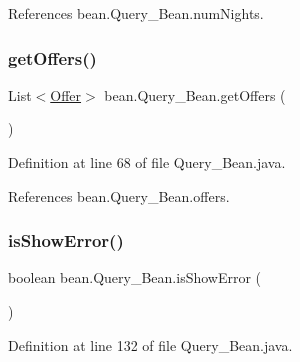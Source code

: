 References bean.\+Query\+\_\+\+Bean.\+num\+Nights.

\mbox{\label{classbean_1_1Query__Bean_a959034af24769ce6348b49a1c0c57d6f}} 
\subsubsection{\texorpdfstring{getOffers()}{getOffers()}}
{\footnotesize\ttfamily List$<$\mbox{\hyperlink{classdomain_1_1Offer}{Offer}}$>$ bean.\+Query\+\_\+\+Bean.\+get\+Offers (\begin{DoxyParamCaption}{ }\end{DoxyParamCaption})}



Definition at line 68 of file Query\+\_\+\+Bean.\+java.


\begin{DoxyCode}{0}

\end{DoxyCode}


References bean.\+Query\+\_\+\+Bean.\+offers.

\mbox{\label{classbean_1_1Query__Bean_a906820e31a37424ec307634523ccfbdd}} 
\subsubsection{\texorpdfstring{isShowError()}{isShowError()}}
{\footnotesize\ttfamily boolean bean.\+Query\+\_\+\+Bean.\+is\+Show\+Error (\begin{DoxyParamCaption}{ }\end{DoxyParamCaption})}



Definition at line 132 of file Query\+\_\+\+Bean.\+java.


\begin{DoxyCode}{0}

\end{DoxyCode}


